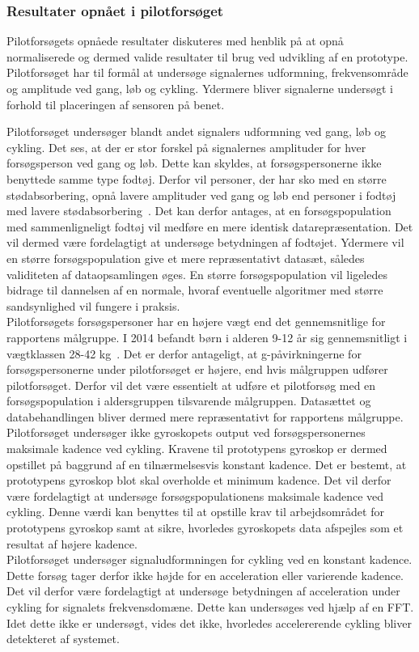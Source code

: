 \subsubsection{Resultater opnået i pilotforsøget}
Pilotforsøgets opnåede resultater diskuteres med henblik på at opnå normaliserede og dermed valide resultater til brug ved udvikling af en prototype.\\
Pilotforsøget har til formål at undersøge signalernes udformning, frekvensområde og amplitude ved gang, løb og cykling. Ydermere bliver signalerne undersøgt i forhold til placeringen af sensoren på benet. 

Pilotforsøget undersøger blandt andet signalers udformning ved gang, løb og cykling. Det ses, at der er stor forskel på signalernes amplituder for hver forsøgsperson ved gang og løb. Dette kan skyldes, at forsøgspersonerne ikke benyttede samme type fodtøj. Derfor vil personer, der har sko med en større stødabsorbering, opnå lavere amplituder ved gang og løb end personer i fodtøj med lavere stødabsorbering~\citep{Novacheck1998}. Det kan derfor antages, at en forsøgspopulation med sammenligneligt fodtøj vil medføre en mere identisk datarepræsentation. Det vil dermed være fordelagtigt at undersøge betydningen af fodtøjet. Ydermere vil en større forsøgspopulation give et mere repræsentativt datasæt, således validiteten af dataopsamlingen øges. En større forsøgspopulation vil ligeledes bidrage til dannelsen af en normale, hvoraf eventuelle algoritmer med større sandsynlighed vil fungere i praksis.\\
Pilotforsøgets forsøgspersoner har en højere vægt end det gennemsnitlige for rapportens målgruppe. I 2014 befandt børn i alderen 9-12 år sig gennemsnitligt i vægtklassen 28-42 kg~\citep{Rigsholspitalet2014}. Det er derfor antageligt, at g-påvirkningerne for forsøgspersonerne under pilotforsøget er højere, end hvis målgruppen udfører pilotforsøget. Derfor vil det være essentielt at udføre et pilotforsøg med en forsøgspopulation i aldersgruppen tilsvarende målgruppen. Datasættet og databehandlingen bliver dermed mere repræsentativt for rapportens målgruppe.\\
Pilotforsøget undersøger ikke gyroskopets output ved forsøgspersonernes maksimale kadence ved cykling. Kravene til prototypens gyroskop er dermed opstillet på baggrund af en tilnærmelsesvis konstant kadence. Det er bestemt, at prototypens gyroskop blot skal overholde et minimum kadence. Det vil derfor være fordelagtigt at undersøge forsøgspopulationens maksimale kadence ved cykling. Denne værdi kan benyttes til at opstille krav til arbejdsområdet for prototypens gyroskop samt at sikre, hvorledes gyroskopets data afspejles som et resultat af højere kadence.\\
Pilotforsøget undersøger signaludformningen for cykling ved en konstant kadence. Dette forsøg tager derfor ikke højde for en acceleration eller varierende kadence. Det vil derfor være fordelagtigt at undersøge betydningen af acceleration under cykling for signalets frekvensdomæne. Dette kan undersøges ved hjælp af en FFT. Idet dette ikke er undersøgt, vides det ikke, hvorledes accelererende cykling bliver detekteret af systemet.

